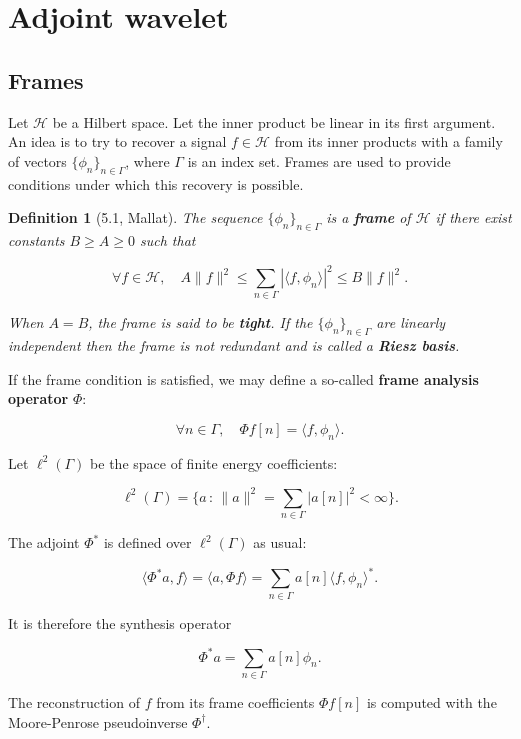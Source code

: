 \documentclass{article}
\theoremstyle{mystuff}
\newtheorem*{definition*}{Definition}
\theoremstyle{myexample}
\theoremstyle{named}
\begin{document}

\section{Adjoint wavelet}

\subsection{Frames}
Let $\mathcal{H}$ be a Hilbert space.  Let the inner product be linear in its first argument.  An idea is to try to recover a signal $f\in\mathcal{H}$ from its inner products with a family of vectors $\{\phi_n\}_{n\in\Gamma}$, where $\Gamma$ is an index set.  Frames are used to provide conditions under which this recovery is possible.\\

\begin{definition*}[5.1, Mallat]
   The sequence $\{\phi_n\}_{n\in\Gamma}$ is a \textbf{frame} of $\mathcal{H}$ if there exist constants $B\ge A\ge 0$ such that 

   \[ \forall f\in\mathcal{H}, \quad A\|f\|^2 \le \sum_{n\in\Gamma} |\langle f, \phi_n\rangle|^2 \le B\|f\|^2. \] 

   \noindent When $A=B$, the frame is said to be \textbf{tight}.  If the $\{\phi_n\}_{n\in\Gamma}$ are linearly independent then the frame is not redundant and is called a \textbf{Riesz basis}.\\
\end{definition*}

\noindent If the frame condition is satisfied, we may define a so-called \textbf{frame analysis operator} $\Phi$:

\[ \forall n\in \Gamma, \quad \Phi f[n] = \langle f, \phi_n\rangle. \] 

\noindent Let $\ell^2(\Gamma)$ be the space of finite energy coefficients:

\[ \ell^2(\Gamma) = \{a \,:\, \|a\|^2 = \sum_{n\in\Gamma} |a[n]|^2 < \infty \}. \] 

\noindent The adjoint $\Phi^\ast$ is defined over $\ell^2(\Gamma)$ as usual:

\[ \langle \Phi^\ast a, f\rangle = \langle a, \Phi f\rangle = \sum_{n\in\Gamma} a[n]\langle f, \phi_n\rangle^\ast. \] 

\noindent It is therefore the synthesis operator

\[ \Phi^\ast a = \sum_{n\in \Gamma} a[n]\phi_n. \] 

The reconstruction of $f$ from its frame coefficients $\Phi f[n]$ is computed with the Moore-Penrose pseudoinverse $\Phi^\dagger$.
\end{document}
